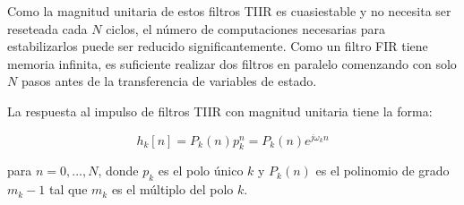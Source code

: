     Como la magnitud unitaria de estos filtros TIIR es cuasiestable y no necesita ser reseteada cada $N$ ciclos, el número de computaciones necesarias para estabilizarlos puede ser reducido significantemente. Como un filtro FIR tiene memoria infinita, es suficiente realizar dos filtros en paralelo comenzando con solo $N$ pasos antes de la transferencia de variables de estado.

    La respuesta al impulso de filtros TIIR con magnitud unitaria tiene la forma:

    \begin{equation}
      h_k[n] = P_k(n) p_k^n = P_k(n) e^{j\omega_k n}
    \end{equation}

    para $n=0,\ldots , N$, donde $p_k$ es el polo único $k$ y $P_k(n)$ es el polinomio de grado $m_k - 1$ tal que $m_k$ es el múltiplo del polo $k$.

